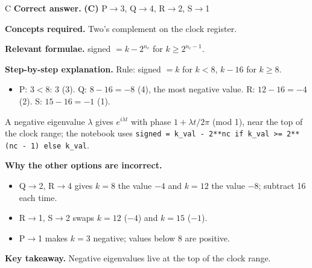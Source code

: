 \documentclass[11pt,a4paper]{article}
\newcommand{\qsep}{\par\vspace{2pt}{\color{black!15}\hrule}\vspace{4pt}}
\begin{document}
\begin{solbox}{C}
\textbf{\color{brand}Correct answer.} \textcolor{okgreen}{\textbf{(C)}} P$\to$3, Q$\to$4, R$\to$2, S$\to$1

\textbf{\color{brand}Concepts required.} Two's complement on the clock register.

\textbf{\color{brand}Relevant formulae.} signed $= k - 2^{n_c}$ for $k \ge 2^{n_c - 1}$.

\textbf{\color{brand}Step-by-step explanation.} Rule: signed $= k$ for $k < 8$, $k - 16$ for $k \ge 8$.
\begin{itemize}\itemsep0pt
\item P: $3 < 8$: $3$ (3). \quad Q: $8 - 16 = -8$ (4), the most negative value. \quad R: $12 - 16 = -4$ (2). \quad S: $15 - 16 = -1$ (1).
\end{itemize}
A negative eigenvalue $\lambda$ gives $e^{i\lambda t}$ with phase $1 + \lambda t/2\pi$ (mod 1), near the top of the clock range; the notebook uses
\texttt{signed = k\_val - 2**nc if k\_val >= 2**(nc - 1) else k\_val}.

\textbf{\color{brand}Why the other options are incorrect.}
\begin{itemize}[leftmargin=2.4em, itemsep=1pt, topsep=2pt]
\item[\textbf{(A)}] Q$\to$2, R$\to$4 gives $k = 8$ the value $-4$ and $k = 12$ the value $-8$; subtract 16 each time.
\item[\textbf{(B)}] R$\to$1, S$\to$2 swaps $k = 12$ ($-4$) and $k = 15$ ($-1$).
\item[\textbf{(D)}] P$\to$1 makes $k = 3$ negative; values below 8 are positive.
\end{itemize}
\textbf{\color{brand}Key takeaway.} Negative eigenvalues live at the top of the clock range.
\end{solbox}
\qsep
\end{document}

